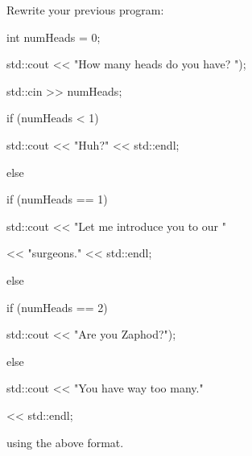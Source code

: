 Rewrite your previous program:

\begin{console}



int numHeads = 0;

std::cout << "How many heads do you have? ");

std::cin >> numHeads;

if (numHeads < 1)

{

   std::cout << "Huh?" << std::endl;

}

else

{

   if (numHeads == 1)

   {

      std::cout << "Let me introduce you to our "

                << "surgeons." << std::endl;

   }

   else

   {

        if (numHeads == 2)

        {

            std::cout << "Are you Zaphod?");

        }

        else

        {

            std::cout << "You have way too many."

                      << std::endl;

        }

   }

}

\end{console}

using the above format.


